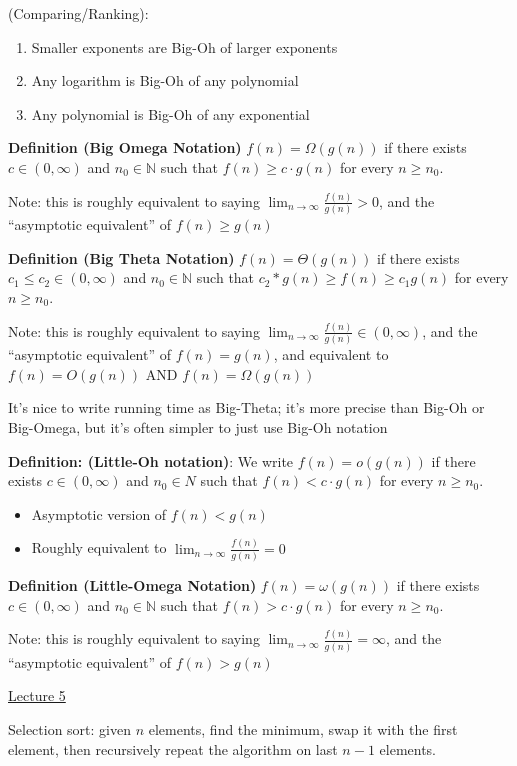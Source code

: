 \documentclass[12pt]{article}
\begin{document}
(Comparing/Ranking): \begin{enumerate}
    \item Smaller exponents are Big-Oh of larger exponents
    \item Any logarithm is Big-Oh of any polynomial
    \item Any polynomial is Big-Oh of any exponential
\end{enumerate}

\textbf{Definition (Big Omega Notation)} $f(n) = \Omega(g(n))$ if there exists $c \in (0, \infty)$ and $n_0 \in \mathbb{N}$ such that $f(n) \geq c \cdot g(n)$ for every $n \geq n_0$.

Note: this is roughly equivalent to saying $\lim_{n \to \infty} \frac{f(n)}{g(n)} > 0$, and the ``asymptotic equivalent'' of $f(n) \geq g(n)$

\textbf{Definition (Big Theta Notation)} $f(n) = \Theta(g(n))$ if there exists $c_1 \leq c_2 \in (0, \infty)$ and $n_0 \in \mathbb{N}$ such that $c_2 * g(n) \geq f(n) \geq c_1 g(n)$ for every $n \geq n_0$.

Note: this is roughly equivalent to saying $\lim_{n \to \infty} \frac{f(n)}{g(n)} \in (0, \infty)$, and the ``asymptotic equivalent'' of $f(n) = g(n)$, and equivalent to $f(n) = O(g(n))$ AND $f(n) = \Omega(g(n))$

It's nice to write running time as Big-Theta; it's more precise than Big-Oh or Big-Omega, but it's often simpler to just use Big-Oh notation

\textbf{Definition: (Little-Oh notation)}: We write $f(n) = o(g(n))$ if there exists $c \in (0, \infty)$ and $n_0 \in N$ such that $f(n) < c \cdot g(n)$ for every $n \geq n_0$. \begin{itemize}
    \item Asymptotic version of $f(n) < g(n)$
    \item Roughly equivalent to $\lim_{n \to \infty} \frac{f(n)}{g(n)} = 0$
\end{itemize}

\textbf{Definition (Little-Omega Notation)} $f(n) = \omega(g(n))$ if there exists $c \in (0, \infty)$ and $n_0 \in \mathbb{N}$ such that $f(n) > c \cdot g(n)$ for every $n \geq n_0$.

Note: this is roughly equivalent to saying $\lim_{n \to \infty} \frac{f(n)}{g(n)} = \infty$, and the ``asymptotic equivalent'' of $f(n) > g(n)$

\underline{Lecture 5}

Selection sort: given $n$ elements, find the minimum, swap it with the first element, then recursively repeat the algorithm on last $n-1$ elements.
\end{document}
